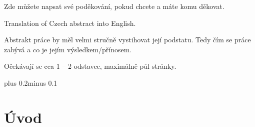 \documentclass[11pt,twoside,a4paper]{book}
\begin{document}

\coverpagestarts


\acknowledgements
\noindent
Zde můžete napsat své poděkování, pokud chcete a máte komu děkovat.





 
\abstractpage

Translation of Czech abstract into English.


\baselineskip

\noindent
Abstrakt práce by měl velmi stručně vystihovat její podstatu. Tedy čím se práce zabývá a co je jejím výsledkem/přínosem.

\noindent
Očekávají se cca 1 -- 2 odstavce, maximálně půl stránky.


\tableofcontents



\listoffigures



\listoftables



\mainbodystarts
\normalfont
{}\baselineskip plus 0.2\baselineskip minus 0.1\baselineskip



\chapter{Úvod}
\end{document}
